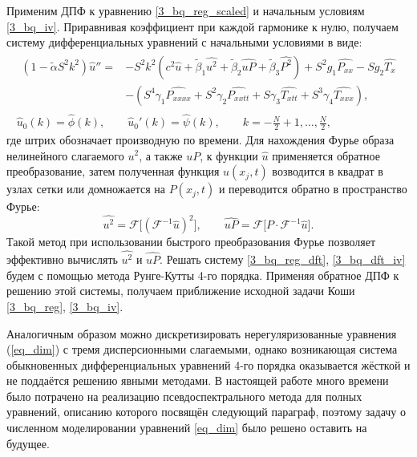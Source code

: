 \documentclass[12pt, a4paper]{report}
\newcommand{\lb}{\left (}
\newcommand{\rb}{\right )}
\begin{document}
Применим ДПФ к уравнению \eqref{3_bq_reg_scaled} и начальным условиям \eqref{3_bq_iv}. Приравнивая коэффициент при каждой гармонике к нулю, получаем систему дифференциальных уравнений с начальными условиями в виде:
\begin{gather}\label{3_bq_reg_dft}
\begin{split}
\lb 1 - \tilde{\alpha} S^2 k^2\rb\widehat u'' =&  -S^2 k^2 \lb c^2 \widehat u + \tilde \beta_1 \widehat{u^2} + \tilde\beta_2\widehat{uP} + \tilde{\beta}_3\widehat{P^2} \rb + S^2 g_1 \widehat{P_{xx}} - S g_2 \widehat{T_x} \\
&- \lb S^4\gamma_1 \widehat{P_{xxxx}} + S^2\gamma_2 \widehat{P_{xxtt}} + S\gamma_3 \widehat{T_{xtt}} + S^3\gamma_4 \widehat{T_{xxx}}\rb,
\end{split}\\
\label{3_bq_dft_iv}
\widehat{u}_0(k) = \widehat{\phi}(k), \qquad \widehat{u}_0'(k) = \widehat{\psi}(k), \qquad k=-\frac N 2 + 1, \dots, \frac N 2,
\end{gather}
где штрих обозначает производную по времени.
Для нахождения Фурье образа нелинейного слагаемого $u^2$, а также $uP$, к функции $\widehat u$ применяется обратное преобразование, затем полученная функция $u(x_j, t)$ возводится в квадрат в узлах сетки или домножается на $P(x_j, t)$ и переводится обратно в пространство Фурье:
$$
\widehat{u^2} = \mathcal{F}\lbrack\lb\mathcal{F}^{-1}\widehat u\rb^2\rbrack, \qquad \widehat{uP} = \mathcal{F}\lbrack P\cdot \mathcal{F}^{-1}\widehat u\rbrack.
$$
Такой метод при использовании быстрого преобразования Фурье позволяет эффективно вычислять $\widehat{u^2}$ и $\widehat{uP}$.
Решать систему \eqref{3_bq_reg_dft}, \eqref{3_bq_dft_iv} будем с помощью метода Рунге-Кутты 4-го порядка. Применяя обратное ДПФ к решению этой системы, получаем приближение исходной задачи Коши \eqref{3_bq_reg}, \eqref{3_bq_iv}.

Аналогичным образом можно дискретизировать нерегуляризованные уравнения (\ref{eq_dim}) с тремя дисперсионными слагаемыми, однако возникающая система обыкновенных дифференциальных уравнений 4-го порядка оказывается жёсткой и не поддаётся решению явными методами. В настоящей работе много времени было потрачено на реализацию псевдоспектрального метода для полных уравнений, описанию которого посвящён следующий параграф, поэтому задачу о численном моделировании уравнений \eqref{eq_dim} было решено оставить на будущее.
\end{document}
